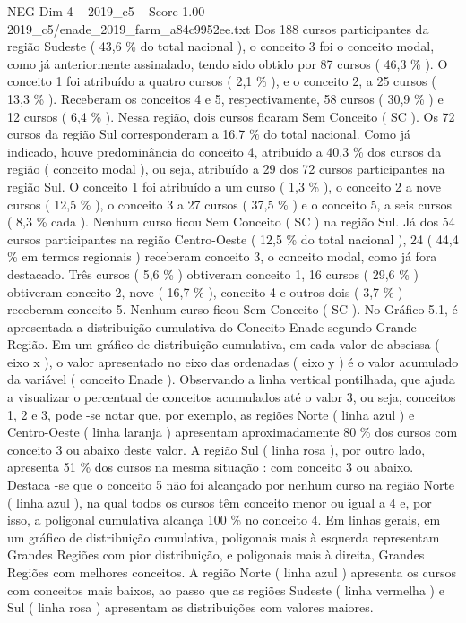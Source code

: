 \begin{textsample}{NEG Dim 4 – 2019\_c5 – Score 1.00 – 2019\_c5/enade\_2019\_farm\_a84c9952ee.txt}
Dos 188 cursos participantes da região Sudeste ( 43,6 \% do total nacional ), o conceito 3 foi o conceito modal, como já anteriormente assinalado, tendo sido obtido por 87 cursos ( 46,3 \% ).
O conceito 1 foi atribuído a quatro cursos ( 2,1 \% ), e o conceito 2, a 25 cursos ( 13,3 \% ).
Receberam os conceitos 4 e 5, respectivamente, 58 cursos ( 30,9 \% ) e 12 cursos ( 6,4 \% ).
Nessa região, dois cursos ficaram Sem Conceito ( SC ).
Os 72 cursos da região Sul corresponderam a 16,7 \% do total nacional.
Como já indicado, houve predominância do conceito 4, atribuído a 40,3 \% dos cursos da região ( conceito modal ), ou seja, atribuído a 29 dos 72 cursos participantes na região Sul.
O conceito 1 foi atribuído a um curso ( 1,3 \% ), o conceito 2 a nove cursos ( 12,5 \% ), o conceito 3 a 27 cursos ( 37,5 \% ) e o conceito 5, a seis cursos ( 8,3 \% cada ).
Nenhum curso ficou Sem Conceito ( SC ) na região Sul.
Já dos 54 cursos participantes na região Centro-Oeste ( 12,5 \% do total nacional ), 24 ( 44,4 \% em termos regionais ) receberam conceito 3, o conceito modal, como já fora destacado.
Três cursos ( 5,6 \% ) obtiveram conceito 1, 16 cursos ( 29,6 \% ) obtiveram conceito 2, nove ( 16,7 \% ), conceito 4 e outros dois ( 3,7 \% ) receberam conceito 5.
Nenhum curso ficou Sem Conceito ( SC ).
No Gráfico 5.1, é apresentada a distribuição cumulativa do Conceito Enade segundo Grande Região.
Em um gráfico de distribuição cumulativa, em cada valor de abscissa ( eixo x ), o valor apresentado no eixo das ordenadas ( eixo y ) é o valor acumulado da variável ( conceito Enade ).
Observando a linha vertical pontilhada, que ajuda a visualizar o percentual de conceitos acumulados até o valor 3, ou seja, conceitos 1, 2 e 3, pode -se notar que, por exemplo, as regiões Norte ( linha azul ) e Centro-Oeste ( linha laranja ) apresentam aproximadamente 80 \% dos cursos com conceito 3 ou abaixo deste valor.
A região Sul ( linha rosa ), por outro lado, apresenta 51 \% dos cursos na mesma situação : com conceito 3 ou abaixo.
Destaca -se que o conceito 5 não foi alcançado por nenhum curso na região Norte ( linha azul ), na qual todos os cursos têm conceito menor ou igual a 4 e, por isso, a poligonal cumulativa alcança 100 \% no conceito 4.
Em linhas gerais, em um gráfico de distribuição cumulativa, poligonais mais à esquerda representam Grandes Regiões com pior distribuição, e poligonais mais à direita, Grandes Regiões com melhores conceitos.
A região Norte ( linha azul ) apresenta os cursos com conceitos mais baixos, ao passo que as regiões Sudeste ( linha vermelha ) e Sul ( linha rosa ) apresentam as distribuições com valores maiores.

\end{textsample}
